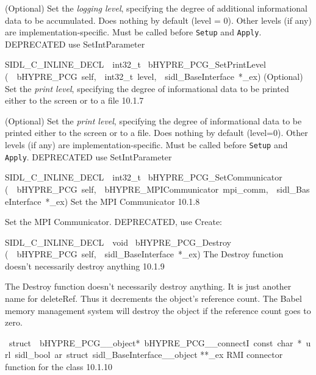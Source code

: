 \documentclass{article}
\begin{document}
\begin{cxxentry}
\begin{cxxentry}
\begin{cxxfunction}
\begin{cxxdoc}
(Optional) Set the {\it logging level}, specifying the degree
of additional informational data to be accumulated.  Does
nothing by default (level = 0).  Other levels (if any) are
implementation-specific.  Must be called before {\tt Setup}
and {\tt Apply}.
DEPRECATED   use SetIntParameter
\end{cxxdoc}
\end{cxxfunction}
\begin{cxxfunction}
{SIDL\_C\_INLINE\_DECL\ \ int32\_t\ }
        {bHYPRE\_PCG\_SetPrintLevel}
        {(\ \ bHYPRE\_PCG\ self,\ \ int32\_t\ level,\ \ sidl\_BaseInterface\ *\_ex)}
        {
(Optional) Set the {\it print level}, specifying the degree
of informational data to be printed either to the screen or
to a file}
        {10.1.7}
\begin{cxxdoc}

(Optional) Set the {\it print level}, specifying the degree
of informational data to be printed either to the screen or
to a file.  Does nothing by default (level=0).  Other levels
(if any) are implementation-specific.  Must be called before
{\tt Setup} and {\tt Apply}.
DEPRECATED   use SetIntParameter
\end{cxxdoc}
\end{cxxfunction}
\begin{cxxfunction}
{SIDL\_C\_INLINE\_DECL\ \ int32\_t\ }
        {bHYPRE\_PCG\_SetCommunicator}
        {(\ \ bHYPRE\_PCG\ self,\ \ bHYPRE\_MPICommunicator\ mpi\_comm,\ \ sidl\_BaseInterface\ *\_ex)}
        {
Set the MPI Communicator}
        {10.1.8}
\begin{cxxdoc}

Set the MPI Communicator.
DEPRECATED, use Create:
\end{cxxdoc}
\end{cxxfunction}
\begin{cxxfunction}
{SIDL\_C\_INLINE\_DECL\ \ void\ }
        {bHYPRE\_PCG\_Destroy}
        {(\ \ bHYPRE\_PCG\ self,\ \ sidl\_BaseInterface\ *\_ex)}
        {
The Destroy function doesn't necessarily destroy anything}
        {10.1.9}
\begin{cxxdoc}

The Destroy function doesn't necessarily destroy anything.
It is just another name for deleteRef.  Thus it decrements the
object's reference count.  The Babel memory management system will
destroy the object if the reference count goes to zero.
\end{cxxdoc}
\end{cxxfunction}
\begin{cxxvariable}
{\ struct\ \ bHYPRE\_PCG\_\_object*\ bHYPRE\_PCG\_\_connectI\ const\ char\ *\ url\ sidl\_bool\ ar\ struct\ sidl\_BaseInterface\_\_object}
        {**\_ex}
        {}
        {
RMI connector function for the class}
        {10.1.10}
\begin{cxxdoc}


\end{cxxdoc}
\end{cxxvariable}
\end{cxxentry}
\end{cxxentry}
\end{document}

